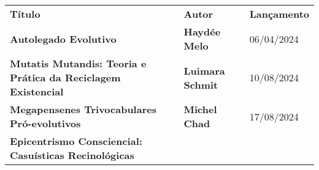 \begin{longtable}[]{@{}
  >{\raggedright\arraybackslash}p{}
  >{\raggedright\arraybackslash}p{}
  >{\raggedright\arraybackslash}p{}@{}}
\toprule\noalign{}
\begin{minipage}[b]{\linewidth}\centering
\textbf{Título}
\end{minipage} & \begin{minipage}[b]{\linewidth}\centering
\textbf{Autor}
\end{minipage} & \begin{minipage}[b]{\linewidth}\centering
\textbf{Lançamento}
\end{minipage} \\
\begin{minipage}[b]{\linewidth}\raggedright
\textbf{Autolegado Evolutivo}
\end{minipage} & \begin{minipage}[b]{\linewidth}\raggedright
\textbf{Haydée Melo}
\end{minipage} & \begin{minipage}[b]{\linewidth}\raggedright
06/04/2024
\end{minipage} \\
\begin{minipage}[b]{\linewidth}\raggedright
\textbf{Mutatis Mutandis: Teoria e Prática da Reciclagem Existencial}
\end{minipage} & \begin{minipage}[b]{\linewidth}\raggedright
\textbf{Luimara Schmit}
\end{minipage} & \begin{minipage}[b]{\linewidth}\raggedright
10/08/2024
\end{minipage} \\
\begin{minipage}[b]{\linewidth}\raggedright
\textbf{Megapensenes Trivocabulares Pró-evolutivos}
\end{minipage} & \begin{minipage}[b]{\linewidth}\raggedright
\textbf{Michel Chad}
\end{minipage} & \begin{minipage}[b]{\linewidth}\raggedright
17/08/2024
\end{minipage} \\
\begin{minipage}[b]{\linewidth}\raggedright
\textbf{Epicentrismo Consciencial: Casuísticas Recinológicas}

\end{minipage}
\end{longtable}
